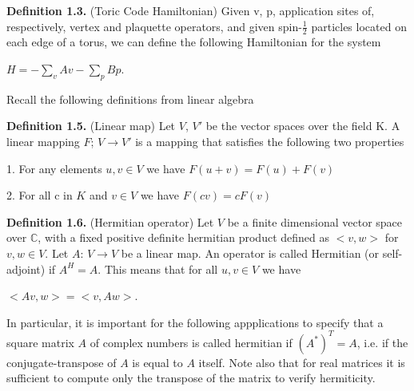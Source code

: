 \documentclass[12pt]{report}
\begin{document}
    
    \begin{minipage}{1\textwidth}
    	
    	\textbf{Definition 1.3.} (Toric Code Hamiltonian) Given v, p, application sites of,  respectively, vertex and plaquette operators, and given spin-$\frac{1}{2}$ particles located on each edge of a torus, we can define the following Hamiltonian for the system\newline
    	
    	\begin{center}
    		
    		$H = -\sum_{v} 
    		Av - \sum_{p} Bp $.\newline
    		
    	\end{center}
    	
    	Recall the following definitions from linear algebra \newline
    	
    	\textbf{Definition 1.5.} (Linear map) Let $V$, $V'$ be the vector spaces over the field K. A linear mapping $F$; $V \rightarrow V'$ is a mapping that satisfies the following two properties \newline
    	
    	1. For any elements $u,v \in V$ we have $F(u + v)=F(u)+F(v)$\newline
    	
    	2. For all c in $K$ and $v \in V$ we have $F(cv)=cF(v)$\newline
    	
    	
    	\textbf{Definition 1.6.} (Hermitian operator) Let $V$ be  a finite dimensional vector space over $\mathbb{C}$, with a fixed positive definite hermitian product defined as $<v,w>$ for $v,w \in V$. Let $A$: $V \rightarrow V$ be a linear map. An operator is called Hermitian (or self-adjoint) if $A^H=A$. This means that for all $u,v \in V$ we have\newline
    	
    	\begin{center}
    		$<Av,w> = <v,Aw>$.
    	\end{center}
    	
    	In particular, it is important for the following appplications to specify that a square matrix $A$ of complex numbers is called hermitian if $(A^*)^T = A$, i.e. if the conjugate-transpose of $A$ is equal to $A$ itself. Note also that for real matrices it is sufficient to compute only the transpose of the matrix to verify hermiticity. \newline
    	

\end{minipage}
\end{document}
